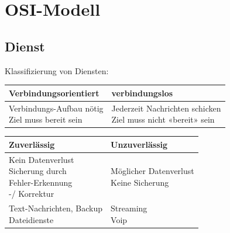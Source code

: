 
\section{OSI-Modell}
\subsection{Dienst}
{Klassifizierung von Diensten:}
{ 
    \begin{center}

        \begin{tabular}{ | l | l |}
            \hline
            Verbindungsorientiert & verbindungslos    \\ \hline
            \makecell{Verbindungs-Aufbau nötig        \\ Ziel muss bereit sein} &
            \makecell{ Jederzeit Nachrichten schicken \\ Ziel muss nicht «bereit» sein} \\   \hline
        \end{tabular}

    \end{center}
    \begin{center}
        \begin{tabular}{ | l | l |}
            \hline
            Zuverlässig & Unzuverlässig          \\ \hline
            \makecell{Kein Datenverlust          \\ Sicherung durch \\Fehler-Erkennung \\ -/ Korrektur} &
            \makecell{ Möglicher Datenverlust    \\ Keine Sicherung} \\   \hline
            \makecell{  Text-Nachrichten, Backup \\ Dateidienste} & \makecell{Streaming \\ Voip}     \\   \hline
        \end{tabular}
    \end{center}
}

